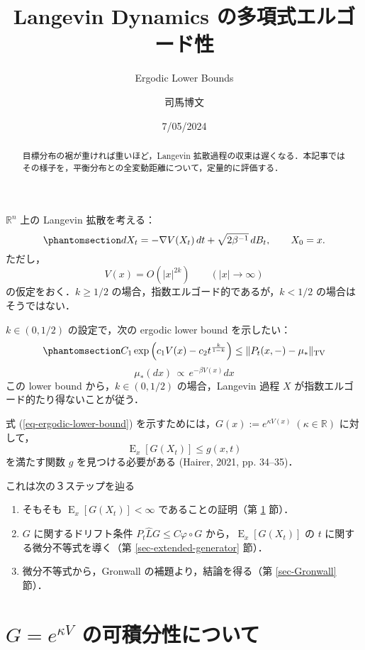 \documentclass[
]{article}
\title{Langevin Dynamics の多項式エルゴード性}
\subtitle{Ergodic Lower Bounds}
\author{司馬博文}
\date{7/05/2024}
\providecommand{\tightlist}{%
  \setlength{\itemsep}{0pt}\setlength{\parskip}{0pt}}\usepackage{longtable,booktabs,array}
\renewcommand{\labelenumi}{(\arabic{enumi})} %
\begin{document}
\maketitle
\begin{abstract}
目標分布の裾が重ければ重いほど，Langevin
拡散過程の収束は遅くなる．本記事ではその様子を，平衡分布との全変動距離について，定量的に評価する．
\end{abstract}


\(\mathbb{R}^n\) 上の Langevin 拡散を考える：
\begin{equation}\phantomsection\label{eq-Langevin}{
dX_t=-\nabla V(X_t)\,dt+\sqrt{2\beta^{-1}}\,dB_t,\qquad X_0=x.
}\end{equation} ただし， \[
V(x)=O(\lvert x\rvert^{2k})\qquad(\lvert x\rvert\to\infty)
\] の仮定をおく．\(k\ge1/2\) の場合，指数エルゴード的であるが，\(k<1/2\)
の場合はそうではない．

\(k\in(0,1/2)\) の設定で，次の ergodic lower bound を示したい：
\begin{equation}\phantomsection\label{eq-ergodic-lower-bound}{
C_1\exp\left(c_1V(x)-c_2t^{\frac{k}{1-k}}\right)\le\|P_t(x,-)-\mu_*\|_\mathrm{TV}
}\end{equation} \[
\mu_*(dx)\,\propto\,e^{-\beta V(x)}dx
\] この lower bound から，\(k\in(0,1/2)\) の場合，Langevin 過程 \(X\)
が指数エルゴード的たり得ないことが従う．

式 (\ref{eq-ergodic-lower-bound})
を示すためには，\(G(x):=e^{\kappa V(x)}\;(\kappa\in\mathbb{R})\)
に対して， \[
\operatorname{E}_x[G(X_t)]\le g(x,t)
\] を満たす関数 \(g\) を見つける必要がある (Hairer, 2021, pp. 34--35)．

これは次の３ステップを辿る

\begin{enumerate}
\def\labelenumi{\arabic{enumi}.}
\tightlist
\item
  そもそも \(\operatorname{E}_x[G(X_t)]<\infty\) であることの証明（第
  \ref{sec-integrability} 節）．
\item
  \(G\) に関するドリフト条件 \(P_t\widehat{L}G\le C\varphi\circ G\)
  から，\(\operatorname{E}_x[G(X_t)]\) の \(t\)
  に関する微分不等式を導く（第 \ref{sec-extended-generator} 節）．
\item
  微分不等式から，Gronwall の補題より，結論を得る（第 \ref{sec-Gronwall}
  節）．
\end{enumerate}

\section{\texorpdfstring{\(G=e^{\kappa V}\)
の可積分性について}{G=e\^{}\{\textbackslash kappa V\} の可積分性について}}\label{sec-integrability}
\end{document}
